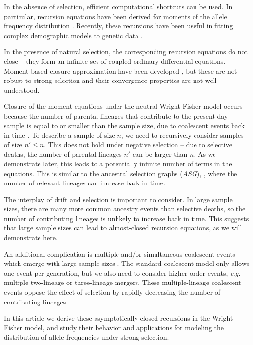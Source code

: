 \documentclass[review]{elsarticle}
\begin{document}
In the absence of selection, efficient computational shortcuts can be used. In particular, recursion
equations have been derived for moments of the allele frequency distribution
\citep{KimuraCrow1964,Ewens1972,JouganousEtAl2017}. Recently, these recursions have been useful in
fitting complex demographic models to genetic data \citep{JouganousEtAl2017,KammEtAl2017}.
 
In the presence of natural selection, the corresponding recursion equations do not close
\citep{Donnelly, JouganousEtAl2017} -- they form an infinite set of coupled ordinary differential
equations. Moment-based closure approximation have been developed \citep{JouganousEtAl2017}, but
these are not robust to strong selection and their convergence properties are not well understood.

Closure of the moment equations under the neutral Wright-Fisher model occurs because the number of
parental lineages that contribute to the present day sample is equal to or smaller than the sample
size, due to coalescent events back in time \citep{Kingman1982a}. To describe a sample of size $n$,
we need to recursively consider samples of size $n'\le n$. This does not hold under negative
selection -- due to selective deaths, the number of parental lineages $n'$ can be larger than $n$.
As we demonstrate later, this leads to a potentially infinite number of terms in the equations. This
is similar to the ancestral selection graphs (\textit{ASG}), \citep{KroneNeuhauser1997}, where the
number of relevant lineages can increase back in time.

The interplay of drift and selection is important to consider. In large sample sizes, there are many
more common ancestry events than selective deaths, so the number of contributing lineages is
unlikely to increase back in time. This suggests that large sample sizes can lead to
almost-closed recursion equations, as we will demonstrate here.

An additional complication is multiple and/or simultaneous coalescent events -- which emerge with
large sample sizes \citep{BhaskarEtAl2014}. The standard coalescent model only allows one event per
generation, but we also need to consider higher-order events, \textit{e.g.} multiple two-lineage or
three-lineage mergers. These multiple-lineage coalescent events oppose the effect of selection by
rapidly decreasing the number of contributing lineages \citep{NelsonEtAl2019}.

In this article we derive these asymptotically-closed recursions in the Wright-Fisher model, and
study their behavior and applications for modeling the distribution of allele frequencies under
strong selection.
\end{document}
